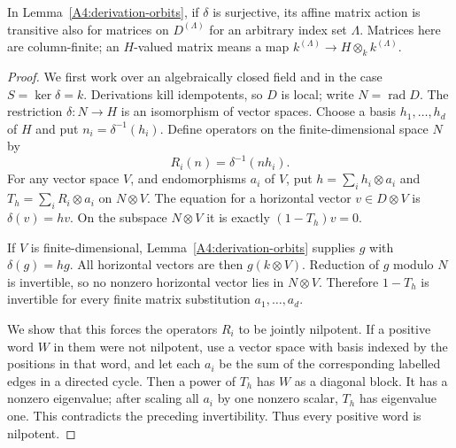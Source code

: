 \begin{lemma}
\label{A4:infinite-orbits}
In Lemma~\ref{A4:derivation-orbits}, if $\delta$ is surjective, its
affine matrix action is transitive also for matrices on $D^{(\Lambda)}$
for an arbitrary index set $\Lambda$.  Matrices here are column-finite;
an $H$-valued matrix means a map
$k^{(\Lambda)}\to H\otimes_k k^{(\Lambda)}$.
\end{lemma}
\begin{proof}
We first work over an algebraically closed field and in the case
$S=\ker\delta=k$.  Derivations kill idempotents, so $D$ is local;
write $N=\operatorname{rad}D$.  The restriction $\delta:N\to H$ is an
isomorphism of vector spaces.  Choose a basis $h_1,\ldots,h_d$ of $H$
and put $n_i=\delta^{-1}(h_i)$.  Define operators on the finite-dimensional
space $N$ by
\[
                 R_i(n)=\delta^{-1}(n h_i).
\]
For any vector space $V$, and endomorphisms $a_i$ of $V$, put
$h=\sum_i h_i\otimes a_i$ and $T_h=\sum_i R_i\otimes a_i$ on $N\otimes V$.
The equation for a horizontal vector $v\in D\otimes V$ is
$\delta(v)=hv$.  On the subspace $N\otimes V$ it is exactly
$(1-T_h)v=0$.

If $V$ is finite-dimensional, Lemma~\ref{A4:derivation-orbits} supplies
$g$ with $\delta(g)=hg$.  All horizontal vectors are then $g(k\otimes V)$.
Reduction of $g$ modulo $N$ is invertible, so no nonzero horizontal vector
lies in $N\otimes V$.  Therefore $1-T_h$ is invertible for every finite
matrix substitution $a_1,\ldots,a_d$.

We show that this forces the operators $R_i$ to be jointly nilpotent.
If a positive word $W$ in them were not nilpotent, use a vector space
with basis indexed by the positions in that word, and let each $a_i$
be the sum of the corresponding labelled edges in a directed cycle.
Then a power of $T_h$ has $W$ as a diagonal block.  It has a nonzero
eigenvalue; after scaling all $a_i$ by one nonzero scalar, $T_h$ has
eigenvalue one.  This contradicts the preceding invertibility.
Thus every positive word is nilpotent.


\end{proof}
